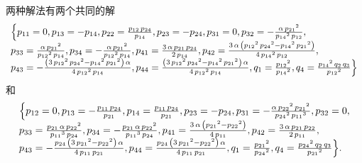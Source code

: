 两种解法有两个共同的解
\begin{equation}
\renewcommand{\arraystretch}{1.2}
\begin{array}{l}
\dbrace{
{{p}_{11}}=0,
{{p}_{13}}=-{{p}_{14}},
{{p}_{22}}=\frac{{{p}_{12}}\,{{p}_{24}}}{{{p}_{14}}},
{{p}_{23}}=-{{p}_{24}},
{{p}_{31}}=0,
{{p}_{32}}=-\frac{\alpha\,{{{p}_{21}}}^{2}}{{{{p}_{14}}}^{2}\,{{p}_{12}}},\\ 
{{p}_{33}}=\frac{\alpha\,{{{p}_{21}}}^{2}}{{{{p}_{12}}}^{2}\,{{p}_{14}}},
{{p}_{34}}=-\frac{\alpha\,{{{p}_{21}}}^{2}}{{{{p}_{12}}}^{2}\,{{p}_{14}}},
{{p}_{41}}=\frac{3\,\alpha\,{{p}_{21}}\,{{p}_{24}}}{2\,{{p}_{14}}},
{{p}_{42}}=\frac{3\,\alpha\,\left( {{{p}_{12}}}^{2}\,{{{p}_{24}}}^{2}-{{{p}_{14}}}^{2}\,{{{p}_{21}}}^{2}\right) }{4\,{{{p}_{14}}}^{2}\,{{p}_{12}}},\\ 
{{p}_{43}}=-\frac{\left( 3\,{{{p}_{12}}}^{2}\,{{{p}_{24}}}^{2}-{{{p}_{14}}}^{2}\,{{{p}_{21}}}^{2}\right) \,\alpha}{4\,{{{p}_{12}}}^{2}\,{{p}_{14}}},
{{p}_{44}}=\frac{\left( 3\,{{{p}_{12}}}^{2}\,{{{p}_{24}}}^{2}-{{{p}_{14}}}^{2}\,{{{p}_{21}}}^{2}\right) \,\alpha}{4\,{{{p}_{12}}}^{2}\,{{p}_{14}}},
{{q}_{1}}=\frac{{{{p}_{12}}}^{2}}{{{{p}_{14}}}^{2}},
{{q}_{4}}=\frac{{{{p}_{14}}}^{2}\,{{q}_{2}}\,{{q}_{3}}}{{{{p}_{12}}}^{2}}
}
\end{array}
\end{equation}
和
\begin{equation}
\renewcommand{\arraystretch}{1.2}
\begin{array}{l}
\dbrace{
{{p}_{12}}=0,
{{p}_{13}}=-\frac{{{p}_{11}}\,{{p}_{24}}}{{{p}_{21}}},
{{p}_{14}}=\frac{{{p}_{11}}\,{{p}_{24}}}{{{p}_{21}}},
{{p}_{23}}=-{{p}_{24}},
{{p}_{31}}=-\frac{\alpha\,{{{p}_{22}}}^{2}\,{{{p}_{21}}}^{2}}{{{{p}_{24}}}^{2}\,{{{p}_{11}}}^{3}},
{{p}_{32}}=0,\\ 
{{p}_{33}}=\frac{{{p}_{21}}\,\alpha\,{{{p}_{22}}}^{2}}{{{{p}_{11}}}^{3}\,{{p}_{24}}},
{{p}_{34}}=-\frac{{{p}_{21}}\,\alpha\,{{{p}_{22}}}^{2}}{{{{p}_{11}}}^{3}\,{{p}_{24}}},
{{p}_{41}}=\frac{3\,\alpha\,\left( {{{p}_{21}}}^{2}-{{{p}_{22}}}^{2}\right) }{4\,{{p}_{11}}},
{{p}_{42}}=\frac{3\,\alpha\,{{p}_{21}}\,{{p}_{22}}}{2\,{{p}_{11}}},\\ 
{{p}_{43}}=-\frac{{{p}_{24}}\,\left( 3\,{{{p}_{21}}}^{2}-{{{p}_{22}}}^{2}\right) \,\alpha}{4\,{{p}_{11}}\,{{p}_{21}}},
{{p}_{44}}=\frac{{{p}_{24}}\,\left( 3\,{{{p}_{21}}}^{2}-{{{p}_{22}}}^{2}\right) \,\alpha}{4\,{{p}_{11}}\,{{p}_{21}}},
{{q}_{1}}=\frac{{{{p}_{21}}}^{2}}{{{{p}_{24}}}^{2}},
{{q}_{4}}=\frac{{{{p}_{24}}}^{2}\,{{q}_{2}}\,{{q}_{3}}}{{{{p}_{21}}}^{2}}
}.
\end{array}
\end{equation}

